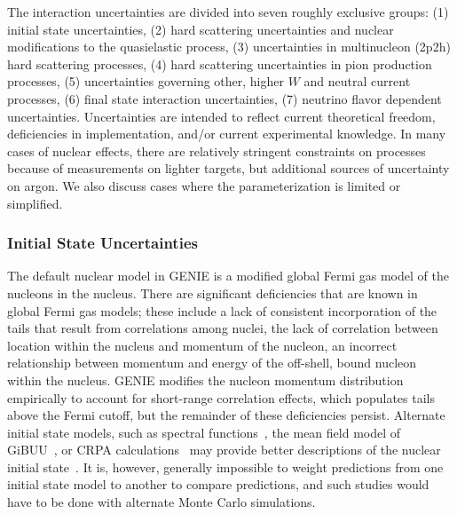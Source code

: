 The interaction uncertainties are divided into seven roughly exclusive groups: (1) initial state uncertainties, (2) hard scattering uncertainties and nuclear modifications to the quasielastic process, (3) uncertainties in multinucleon (2p2h) hard scattering processes, (4) hard scattering uncertainties in pion production processes, (5) uncertainties governing other, higher $W$ and neutral current processes, (6) final state interaction uncertainties, (7) neutrino flavor dependent uncertainties. Uncertainties are intended to reflect current theoretical freedom, deficiencies in implementation, and/or current experimental knowledge.  In many cases of nuclear effects, there are relatively stringent constraints on processes because of measurements on lighter targets, but additional sources of uncertainty on argon.  We also discuss cases where the parameterization is limited or simplified.

\subsubsection{Initial State Uncertainties}
The default nuclear model in GENIE is a modified global Fermi gas model of the nucleons in the nucleus.  There are significant deficiencies that are known in global Fermi gas models; these include a lack of consistent incorporation of the tails that result from correlations among nuclei, the lack of correlation between location within the nucleus and momentum of the nucleon, an incorrect relationship between momentum and energy of the off-shell, bound nucleon within the nucleus. GENIE modifies the nucleon momentum distribution empirically to account for short-range correlation effects, which populates tails above the Fermi cutoff, but the remainder of these deficiencies persist. Alternate initial state models, such as spectral functions~\cite{Benhar:1994hw,Nieves:2004wx}, the mean field model of GiBUU~\cite{Gallmeister:2016dnq}, or CRPA calculations~\cite{Pandey:2014tza} may provide better descriptions of the nuclear initial state~\cite{Sobczyk:2017mts}.  It is, however, generally impossible to weight predictions from one initial state model to another to compare predictions, and such studies would have to be done with alternate Monte Carlo simulations.

